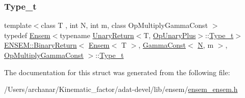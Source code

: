 \subsubsection{\texorpdfstring{Type\_t}{Type\_t}\hspace{0.1cm}{\footnotesize\ttfamily [3/3]}}
{\footnotesize\ttfamily template$<$class T , int N, int m, class Op\+Multiply\+Gamma\+Const $>$ \\
typedef \mbox{\hyperlink{classENSEM_1_1Ensem}{Ensem}}$<$typename \mbox{\hyperlink{structENSEM_1_1UnaryReturn}{Unary\+Return}}$<$T, \mbox{\hyperlink{structENSEM_1_1OpUnaryPlus}{Op\+Unary\+Plus}}$>$\+::\mbox{\hyperlink{structENSEM_1_1BinaryReturn_3_01Ensem_3_01T_01_4_00_01GammaConst_3_01N_00_01m_01_4_00_01OpMultiplyGammaConst_01_4_a1e55c80ef6e9dca68a09e4de3cc64da6}{Type\+\_\+t}}$>$ \mbox{\hyperlink{structENSEM_1_1BinaryReturn}{E\+N\+S\+E\+M\+::\+Binary\+Return}}$<$ \mbox{\hyperlink{classENSEM_1_1Ensem}{Ensem}}$<$ T $>$, \mbox{\hyperlink{classENSEM_1_1GammaConst}{Gamma\+Const}}$<$ \mbox{\hyperlink{adat__devel_2lib_2hadron_2operator__name__util_8cc_a7722c8ecbb62d99aee7ce68b1752f337}{N}}, m $>$, \mbox{\hyperlink{structENSEM_1_1OpMultiplyGammaConst}{Op\+Multiply\+Gamma\+Const}} $>$\+::\mbox{\hyperlink{structENSEM_1_1BinaryReturn_3_01Ensem_3_01T_01_4_00_01GammaConst_3_01N_00_01m_01_4_00_01OpMultiplyGammaConst_01_4_a1e55c80ef6e9dca68a09e4de3cc64da6}{Type\+\_\+t}}}



The documentation for this struct was generated from the following file\+:\begin{DoxyCompactItemize}
\item 
/\+Users/archanar/\+Kinematic\+\_\+factor/adat-\/devel/lib/ensem/\mbox{\hyperlink{adat-devel_2lib_2ensem_2ensem__ensem_8h}{ensem\+\_\+ensem.\+h}}\end{DoxyCompactItemize}

